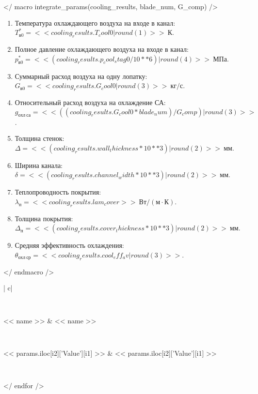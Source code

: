 \documentclass[a4paper,10pt]{article}
\begin{document}
\begin{enumerate}
        \end{enumerate}

    </ macro integrate_params(cooling_results, blade_num, G_comp) />
    \begin{enumerate}

        \item Температура охлаждающего воздуха на входе в канал:
            $ T_{в0}^{*} = << cooling_results.T_cool0 | round(1) >>\ К$.
        \item Полное давление охлаждающего воздуха на входе в канал:
            $ p_{в0}^* = << (cooling_results.p_cool_stag0 / 10**6) | round(4) >>\ МПа $.
        \item Суммарный расход воздуха на одну лопатку: $G_{в0} = << cooling_results.G_cool0 | round(3) >>\ кг/с$.
        \item Относительный расход воздуха на охлаждение СА:
            $g_{охл\ са} = << ((cooling_results.G_cool0 * blade_num) / G_comp) | round(3) >>$.
        \item Толщина стенок: $\Delta = << (cooling_results.wall_thickness * 10**3) | round(2) >>\ мм$.
        \item Ширина канала: $\delta = << (cooling_results.channel_width * 10**3) | round(2) >>\ мм$.
        \item Теплопроводность покрытия: $\lambda_п = << cooling_results.lam_cover >>\ Вт/(м \cdot К)$.
        \item Толщина покрытия: $\Delta_п = << (cooling_results.cover_thickness * 10**3) | round(2) >>\ мм$.
        \item Средняя эффективность охлаждения: $\theta_{охл\ ср} = << cooling_results.cool_eff_av | round(3) >>$.
    \end{enumerate}
    </ endmacro />

    \begin{longtable}{
     |
    c|
    }
        \caption{<< caption >>} \\
        \hline

        << name >>
        & << name >>

        \\
        \hline



        << params.iloc[i2]['Value'][i1] >>
        & << params.iloc[i2]['Value'][i1] >>

        \\
        \hline

        </ endfor />
    \end{longtable}
\end{document}
